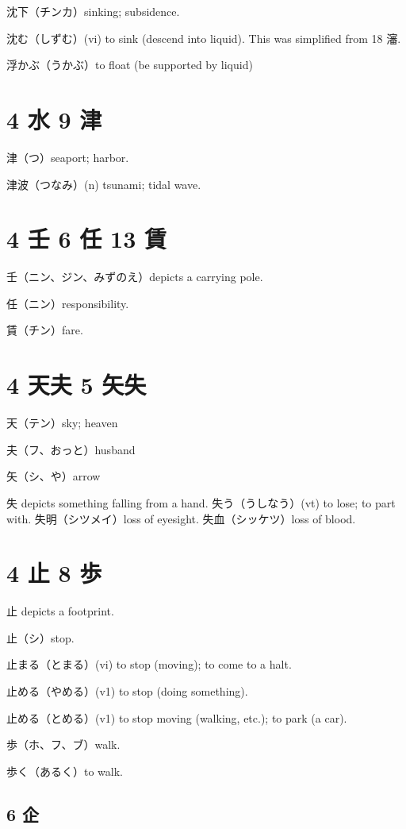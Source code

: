 沈下（チンカ）sinking; subsidence.

沈む（しずむ）(vi) to sink (descend into liquid).
This was simplified from 18 瀋.

浮かぶ（うかぶ）to float (be supported by liquid)

\section{4 水 9 津}

津（つ）seaport; harbor.

津波（つなみ）(n) tsunami; tidal wave.

\section{4 壬 6 任 13 賃}

壬（ニン、ジン、みずのえ）depicts a carrying pole.

任（ニン）responsibility.

賃（チン）fare.

\section{4 天夫 5 矢失}

天（テン）sky; heaven

夫（フ、おっと）husband

矢（シ、や）arrow

失 depicts something falling from a hand.
失う（うしなう）(vt) to lose; to part with.
失明（シツメイ）loss of eyesight.
失血（シッケツ）loss of blood.

\section{4 止 8 歩}

止 depicts a footprint.

止（シ）stop.

止まる（とまる）(vi) to stop (moving); to come to a halt.

止める（やめる）(v1) to stop (doing something).

止める（とめる）(v1) to stop moving (walking, etc.); to park (a car).

歩（ホ、フ、ブ）walk.

歩く（あるく）to walk.

\subsection{6 企}

